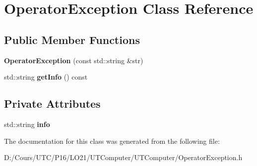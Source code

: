 \hypertarget{class_operator_exception}{}\section{Operator\+Exception Class Reference}
\label{class_operator_exception}
\subsection*{Public Member Functions}
\begin{DoxyCompactItemize}
\item 
{\bfseries Operator\+Exception} (const std\+::string \&str)\hypertarget{class_operator_exception_a0a3e109c75dc9c9e8db314399585c5d1}{}\label{class_operator_exception_a0a3e109c75dc9c9e8db314399585c5d1}

\item 
std\+::string {\bfseries get\+Info} () const \hypertarget{class_operator_exception_ad9658cb08568b91c6e5ac86ce51c59b7}{}\label{class_operator_exception_ad9658cb08568b91c6e5ac86ce51c59b7}

\end{DoxyCompactItemize}
\subsection*{Private Attributes}
\begin{DoxyCompactItemize}
\item 
std\+::string {\bfseries info}\hypertarget{class_operator_exception_aebc5f900bf87e1c83c3e2980aae22790}{}\label{class_operator_exception_aebc5f900bf87e1c83c3e2980aae22790}

\end{DoxyCompactItemize}


The documentation for this class was generated from the following file\+:\begin{DoxyCompactItemize}
\item 
D\+:/\+Cours/\+U\+T\+C/\+P16/\+L\+O21/\+U\+T\+Computer/\+U\+T\+Computer/Operator\+Exception.\+h\end{DoxyCompactItemize}
